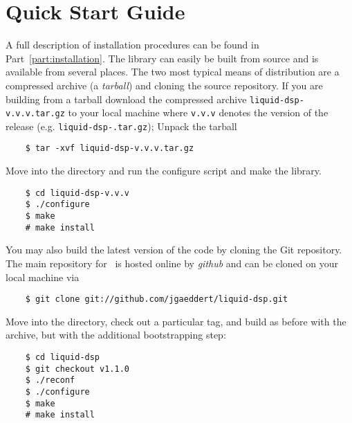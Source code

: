 %
%

\section{Quick Start Guide}
\label{section:quickstart}
A full description of installation procedures can be found in
Part~\ref{part:installation}.
The library can easily be built from source and is available from
several places.
The two most typical means of distribution are a compressed archive
(a {\em tarball}) and cloning the source repository.
If you are building from a tarball
download the compressed archive {\tt liquid-dsp-v.v.v.tar.gz} to your
local machine where {\tt v.v.v} denotes the version of the release
(e.g. {\tt liquid-dsp-\liquidversion.tar.gz});
%
%
%
%
Unpack the tarball
%
\begin{verbatim}
    $ tar -xvf liquid-dsp-v.v.v.tar.gz
\end{verbatim}
%
Move into the directory and run the configure script and make the
library.
%
\begin{verbatim}
    $ cd liquid-dsp-v.v.v
    $ ./configure
    $ make
    # make install
\end{verbatim}
%
You may also build the latest version of the code by cloning the
Git repository.
The main repository for \liquid\ is hosted online by {\em github}
\cite{github:web} and can be cloned on your local machine via
%
\begin{verbatim}
    $ git clone git://github.com/jgaeddert/liquid-dsp.git
\end{verbatim}
%
Move into the directory, check out a particular tag, and build as before
with the archive, but with the additional bootstrapping step:
%
\begin{verbatim}
    $ cd liquid-dsp
    $ git checkout v1.1.0
    $ ./reconf
    $ ./configure
    $ make
    # make install
\end{verbatim}

